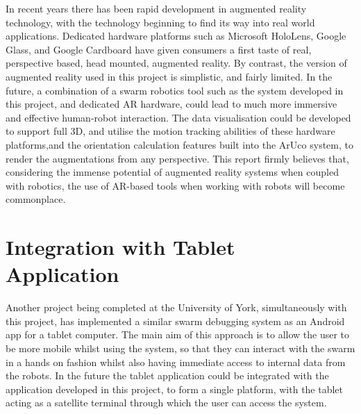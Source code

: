 In recent years there has been rapid development in augmented reality technology, with the technology beginning to find its way into real world applications. Dedicated hardware platforms such as Microsoft HoloLens, Google Glass, and Google Cardboard have given consumers a first taste of real, perspective based, head mounted, augmented reality. By contrast, the version of augmented reality used in this project is simplistic, and fairly limited. In the future, a combination of a swarm robotics tool such as the system developed in this project, and dedicated AR hardware, could lead to much more immersive and effective human-robot interaction. The data visualisation could be developed to support full 3D, and utilise the motion tracking abilities of these hardware platforms,and the orientation calculation features built into the ArUco system, to render the augmentations from any perspective. This report firmly believes that, considering the immense potential of augmented reality systems when coupled with robotics, the use of AR-based tools when working with robots will become commonplace.


\section{Integration with Tablet Application}

Another project being completed at the University of York, simultaneously with this project, has implemented a similar swarm debugging system as an Android app for a tablet computer. The main aim of this approach is to allow the user to be more mobile whilst using the system, so that they can interact with the swarm in a hands on fashion whilst also having immediate access to internal data from the robots. In the future the tablet application could be integrated with the application developed in this project, to form a single platform, with the tablet acting as a satellite terminal through which the user can access the system.


